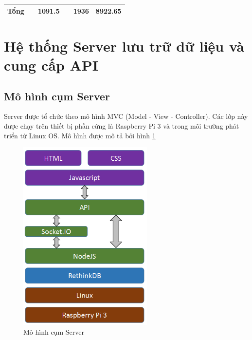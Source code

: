 \begin{table}[H]
\begin{tabular}{|l|l|r|r|r|r|}
		\textbf{Tổng} & \textbf{}                                                             & \textbf{1091.5}                                                                             & \textbf{}                                                                                  & \textbf{1936}                                                                                   & \textbf{8922.65}                                                                       \\ \hline
	\end{tabular}
\end{table}

\section{Hệ thống Server lưu trữ dữ liệu và cung cấp API}
\subsection{Mô hình cụm Server }
Server được tổ chức theo mô hình MVC (Model - View - Controller). Các lớp này được chạy trên thiết bị phần cứng là Raspberry Pi 3 và trong môi trường phát triển từ Linux OS. Mô hình được mô tả bởi hình \ref{fig: strucserver}

\begin{figure}[H]
	\centering    
	\includegraphics[width=0.6\textwidth]{strucserver}
	\caption[Mô hình cụm Server]{Mô hình cụm Server}
	\label{fig: strucserver}
\end{figure}

